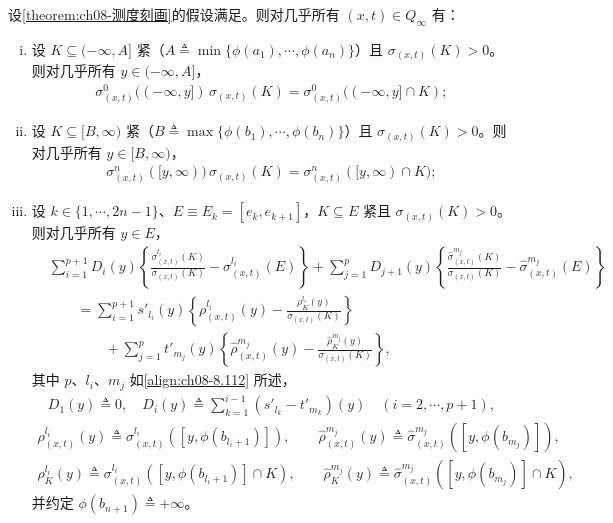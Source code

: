 \documentclass[../../main.tex]{subfiles}%
\begin{document}
\begin{lemma}[各分支上的矩关系]\label{lemma:ch08-矩等式}
设\cref{theorem:ch08-测度刻画}的假设满足。则对几乎所有 $(x,t)\in Q_\infty$ 有：
\begin{enumerate}[(i)]
\item\label{item:ch08-mom-i} 设 $K\subseteq(-\infty,A]$ 紧（$A\triangleq\min\{\phi(a_1),\cdots ,\phi(a_n)\}$）且 $\sigma_{(x,t)}(K)>0$。则对几乎所有 $y\in(-\infty,A]$，
\begin{align}
\sigma^0_{(x,t)}((-\infty,y])\,\sigma_{(x,t)}(K)=\sigma^0_{(x,t)}((-\infty,y]\cap K); \label{align:ch08-8.113}
\end{align}
\item\label{item:ch08-mom-ii} 设 $K\subseteq[B,\infty)$ 紧（$B\triangleq\max\{\phi(b_1),\cdots ,\phi(b_n)\}$）且 $\sigma_{(x,t)}(K)>0$。则对几乎所有 $y\in[B,\infty)$，
\begin{align}
\sigma^n_{(x,t)}([y,\infty))\,\sigma_{(x,t)}(K)=\sigma^n_{(x,t)}([y,\infty)\cap K); \label{align:ch08-8.114}
\end{align}
\item\label{item:ch08-mom-iii} 设 $k\in\{1,\cdots ,2n-1\}$、$E\equiv E_k=[e_k,e_{k+1}]$，$K\subseteq E$ 紧且 $\sigma_{(x,t)}(K)>0$。则对几乎所有 $y\in E$，
\begin{align*}
&\sum_{i=1}^{p+1}D_i(y)\left\{\frac{\sigma^{l_i}_{(x,t)}(K)}{\sigma_{(x,t)}(K)}-\sigma^{l_i}_{(x,t)}(E)\right\}
+\sum_{j=1}^{p}D_{j+1}(y)\left\{\frac{\widehat\sigma^{m_j}_{(x,t)}(K)}{\sigma_{(x,t)}(K)}-\widehat\sigma^{m_j}_{(x,t)}(E)\right\}\\
&\qquad=\sum_{i=1}^{p+1}s'_{l_i}(y)\left\{\rho^{l_i}_{(x,t)}(y)-\frac{\rho^{l_i}_K(y)}{\sigma_{(x,t)}(K)}\right\}\\
&\qquad\qquad+\sum_{j=1}^{p}t'_{m_j}(y)\left\{\widehat\rho^{m_j}_{(x,t)}(y)-\frac{\widehat\rho^{m_j}_K(y)}{\sigma_{(x,t)}(K)}\right\},
\end{align*}
其中 $p$、$l_i$、$m_j$ 如\eqref{align:ch08-8.112} 所述，
\begin{align*}
D_1(y)\triangleq 0,\quad D_i(y)\triangleq \sum_{k=1}^{i-1}(s'_{l_k}-t'_{m_k})(y)\quad(i=2,\cdots ,p+1),
\end{align*}
\begin{align*}
\rho^{l_i}_{(x,t)}(y)\triangleq \sigma^{l_i}_{(x,t)}([y,\phi(b_{l_i+1})]),\qquad
\widehat\rho^{m_j}_{(x,t)}(y)\triangleq \widehat\sigma^{m_j}_{(x,t)}([y,\phi(b_{m_j})]),
\end{align*}
\begin{align*}
\rho^{l_i}_K(y)\triangleq \sigma^{l_i}_{(x,t)}([y,\phi(b_{l_i+1})]\cap K),\qquad
\widehat\rho^{m_j}_K(y)\triangleq \widehat\sigma^{m_j}_{(x,t)}([y,\phi(b_{m_j})]\cap K),
\end{align*}
并约定 $\phi(b_{n+1})\triangleq+\infty$。
\end{enumerate}
\end{lemma}
\end{document}
